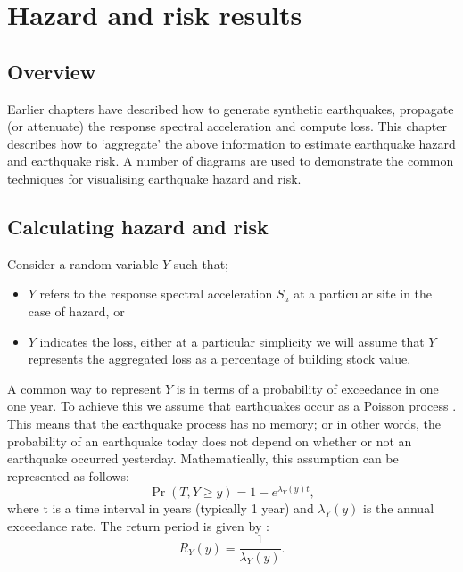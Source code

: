 \chapter{Hazard and risk results}
\label{ch:risk}


\section{Overview}

Earlier chapters have described how to generate synthetic
earthquakes, propagate (or attenuate) the response spectral
acceleration and compute
loss. This chapter describes how to `aggregate' the above
information to estimate earthquake hazard and earthquake risk. A
number of diagrams are used to demonstrate the common techniques
for visualising earthquake hazard and risk.

\section{Calculating hazard and risk}

Consider a random variable $Y$ such that; \begin{itemize} \item
$Y$ refers to the response spectral acceleration $S_a$ at a particular site in the case of
hazard, or \item $Y$ indicates the loss, either at a particular
simplicity we will assume that $Y$ represents the aggregated loss
as a percentage of building stock value.
\end{itemize}

A common way to represent $Y$ is in terms of a probability of
exceedance in one one year. To achieve this we assume that
earthquakes occur as a Poisson process \citep{dr_McGuire90a}. This
means that the earthquake process has no memory; or in other
words, the probability of an earthquake today does not depend on
whether or not an earthquake occurred yesterday. Mathematically,
this assumption can be represented as follows:
\begin{equation}
 \Pr(T, Y\ge y) = 1 - e^{\lambda_Y(y)t},
\end{equation}
where t is a time interval in years (typically 1 year) and
$\lambda_Y(y)$ is the annual exceedance rate. The return period is
given by :
\begin{equation}
\label{eq:risk-rptolambda} R_Y(y) = \frac{1}{\lambda_Y(y)}.
\end{equation}

